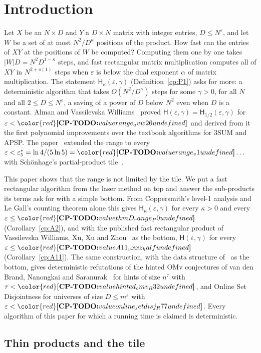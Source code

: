 \documentclass[11pt]{article}
\makeatletter
\theoremstyle{definition}
\theoremstyle{remark}
\DeclareRobustCommand{\CPTODO}[1]{{\color{red}\textbf{[CP-TODO:} #1\textbf{]}}}
\providecommand{\eps}{\varepsilon}
\newcommand{\abs}[1]{\lvert #1\rvert}
\newcommand{\Hyp}{\mathsf{H}}                 %
\newcommand{\Hypk}[1]{\mathsf{H}_{#1}}        %
\newcommand{\es}{\varepsilon^*_5}             %
\newcommand{\cpv}[1]{\ifcsname cpv@#1\endcsname\csname cpv@#1\endcsname\else\CPTODO{value #1 undefined}\fi}
\makeatother
\begin{document}
\tableofcontents

\section{Introduction}\label{cp:sec:intro}

Let $X$ be an $N\times D$ and $Y$ a $D\times N$ matrix with integer entries, $D\le N^\eps$, and let $W$ be a set of at most $N^2/D^\kappa$ positions of the product. How fast can the entries of $XY$ at the positions of $W$ be computed? Computing them one by one takes $\abs WD=N^2D^{1-\kappa}$ steps, and fast rectangular matrix multiplication computes all of $XY$ in $N^{2+o(1)}$ steps when $\eps$ is below the dual exponent $\alpha$ of matrix multiplication. The statement $\Hypk\kappa(\eps,\gamma)$ (Definition~\ref{cp:P1}) asks for more: a deterministic algorithm that takes $O(N^2/D^\gamma)$ steps for some $\gamma>0$, for all $N$ and all $2\le D\le N^\eps$, a saving of a power of $D$ below $N^2$ even when $D$ is a constant. Alman and Vassilevska Williams~\cite{AV26} proved $\Hyp(\eps,\gamma)=\Hypk{1/2}(\eps,\gamma)$ for $\eps<\cpv{range_avw26}$ and derived from it the first polynomial improvements over the textbook algorithms for 3SUM and APSP. The paper~\cite{v2} extended the range to every $\eps<\es=\ln4/(5\ln5)=\cpv{range_v1}\ldots$ with Schönhage's partial-product tile~\cite{Sch81}.

This paper shows that the range is not limited by the tile. We put a fast rectangular algorithm from the laser method on top and answer the sub-products its terms ask for with a simple bottom. From Coppersmith's level-1 analysis and Le Gall's counting theorem alone this gives $\Hypk\kappa(\eps,\gamma)$ for every $\kappa>0$ and every $\eps\le\cpv{thmD_range_P0}$ (Corollary~\ref{cp:A2}), and with the published fast rectangular product of Vassilevska Williams, Xu, Xu and Zhou~\cite{VXXZ24} as the bottom, $\Hyp(\eps,\gamma)$ for every $\eps\le\cpv{A11_vxxz_half}$ (Corollary~\ref{cp:A11}). The same construction, with the data structure of~\cite{v2} as the bottom, gives deterministic refutations of the hinted OMv conjectures of van den Brand, Nanongkai and Saranurak~\cite{BNS19} for hints of size $n^\tau$ with $\tau<\cpv{hinted_omv_R32}$, and Online Set Disjointness for universes of size $D\le m^{\eps}$ with $\eps<\cpv{online_setdisj_R77}$. Every algorithm of this paper for which a running time is claimed is deterministic.

\subsection{Thin products and the tile}\label{cp:sec:intro:v1}
\end{document}
